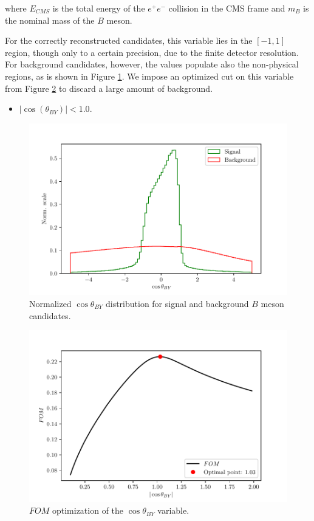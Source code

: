 \documentclass[oneside,a4paper,openany,12pt]{scrbook}
\begin{document}
where $E_{CMS}$ is the total energy of the $e^+e^-$ collision in the CMS frame and $m_B$ is the nominal mass of the $B$ meson. 

For the correctly reconstructed candidates, this variable lies in the $[-1,1]$ region, though only to a certain precision, due to the finite detector resolution. For background candidates, however, the values populate also the non-physical regions, as is shown in Figure \ref{fig:cosbyvar}. We impose an optimized cut on this variable from Figure \ref{fig:cosbyopt} to discard a large amount of background.
\begin{itemize}
\item $\vert \cos \left(\theta_{BY}\right) \vert < 1.0$.
\end{itemize}

\begin{figure}[H]
\centering
\captionsetup{width=.7\linewidth}
\includegraphics[scale=0.6]{fig/cosBY_var}
\caption{Normalized $\cos \theta_{BY}$ distribution for signal and background $B$ meson candidates.}
\label{fig:cosbyvar}
\end{figure}

\begin{figure}[H]
\centering
\captionsetup{width=.7\linewidth}
\includegraphics[scale=0.6]{fig/cosBY_opt}
\caption{$FOM$ optimization of the $\cos \theta_{BY}$ variable.}
\label{fig:cosbyopt}
\end{figure}
\end{document}
